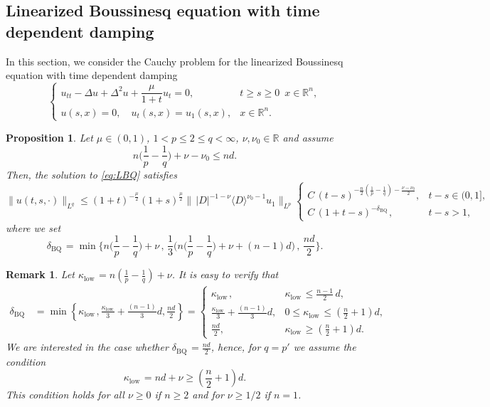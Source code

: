 \documentclass[10pt]{article}
\newtheorem{proposition}{Proposition}[section]
\newtheorem{remark}{Remark}[section]
\newcommand{\<}{\langle}
\renewcommand{\>}{\rangle}
\numberwithin{equation}{section}
\newcommand{\R}{{\mathbb{R}}}
\newcommand{\low}{{\mathrm{low\,}}}
\newcommand{\BQ}{{\mathrm{BQ\,}}}
\begin{document}
\subsection{Linearized Boussinesq equation with time dependent damping}\label{sec:linear}
In this section, we consider the Cauchy problem for the linearized Boussinesq equation with time dependent damping
\begin{equation}\label{eq:LBQ}
\begin{cases}
u_{tt}-\Delta u +\Delta^2 u+ \dfrac{\mu}{1+t} u_t =0, & t\geq s\geq 0\,\,\, x\in\R^n,\\
u(s,x)=0, \quad u_t(s,x)=u_1(s, x), & x\in\mathbb{R}^n.
\end{cases}
\end{equation}
\begin{proposition}\label{Prop1}
Let $\mu\in (0,1)$, $1< p\leq 2\leq q <\infty$, $\nu,\nu_0\in \mathbb{R}$ and assume
\begin{equation*}
n\Big(\frac1p-\frac1q\Big)+\nu-\nu_0 \leq nd.
\end{equation*}
Then, the solution to \eqref{eq:LBQ} satisfies
\begin{equation*}
\|u(t, s, \cdot)\|_{L^q} \leq (1+t)^{-\frac{\mu}2}(1+s)^{\frac{\mu}2}\|\,|D|^{-1-\nu}\<D\>^{\nu_0-1}u_1\|_{L^p}
\begin{cases}
C\,(t-s)^{-\frac{n}{2}\left(\frac1p-\frac1q\right)-\frac{\nu-\nu_0}{2}}, & t-s\in (0, 1], \\
C\,(1+t-s)^{-\delta_\BQ}, & t-s>1,
\end{cases}
\end{equation*}
where we set
\[ \delta_\BQ=\min\Big\{ n\big(\frac1p-\frac1q\big)+\nu\,,\, \frac13\Big(n\big(\frac1p-\frac1q\big)+\nu+(n-1)d\Big)\,,\, \frac{nd}{2}\Big\}. \]
\end{proposition}
\begin{remark}\label{remarkKey} Let $\kappa_{\low}=n\left(\frac1p-\frac1q\right)+\nu$. It is easy to verify that
\begin{equation*} \label{eq:deltaBQ}
\begin{split}
\delta_\BQ
    & = \min\left\{\kappa_\low, \frac{\kappa_\low}3+\frac{(n-1)}{3}d, \frac{nd}2\right\} = \begin{cases}
\kappa_\low, & \kappa_\low\leq\frac{n-1}2 \,d,\\
\frac{\kappa_\low}{3}+\frac{(n-1)}{3}d, & 0\leq \kappa_\low\leq \left(\frac{n}2+1\right) d,\\
\frac{nd}{2}, & \kappa_\low\geq \left(\frac{n}2 +1\right) d.
\end{cases}
\end{split}
\end{equation*}
We are interested in the case whether $\delta_\BQ=\frac{nd}2$, hence, for $q=p'$ we assume the condition
\[\kappa_\low=nd+\nu\geq \left(\frac{n}2+1\right) d.\]
This condition holds for all  $\nu\geq 0$ if $n\geq 2$ and for $\nu\geq 1/2$ if $n= 1$.
\end{remark}
\end{document}
